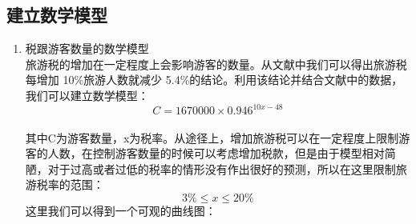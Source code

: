 \documentclass[12pt]{article}  %
\begin{document}
 \subsection{建立数学模型}
 \begin{enumerate}[(1)]
    \setlength{\parsep}{0ex} %
\setlength{\topsep}{2ex} %
\setlength{\itemsep}{1ex} %
\item 税跟游客数量的数学模型\\
旅游税的增加在一定程度上会影响游客的数量。从文献\cite{taxandtour}中我们可以得出旅游税每增加 10\%旅游人数就减少 5.4\%的结论。利用该结论并结合文献\cite{pop}中的数据，我们可以建立数学模型：\\
$$C=1670000 \times 0.946^{10x-48}$$\\
其中C为游客数量，x为税率。从途径上，增加旅游税可以在一定程度上限制游客的人数，在控制游客数量的时候可以考虑增加税款，但是由于模型相对简陋，对于过高或者过低的税率的情形没有作出很好的预测，所以在这里限制旅游税率的范围：$$3\% \leq x  \leq 20\%$$
这里我们可以得到一个可观的曲线图：
\begin{figure}[htbp]  %
 

\end{figure}
\end{enumerate}
\end{document}
